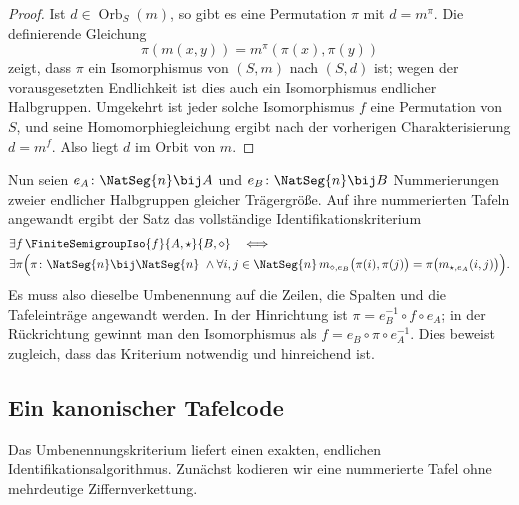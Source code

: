 \documentclass[main.tex]{subfiles}
\begin{document}
\begin{proof}
Ist \(d\in\operatorname{Orb}_S(m)\), so gibt es eine Permutation \(\pi\)
mit \(d=m^\pi\).  Die definierende Gleichung
\[
  \pi(m(x,y))=m^\pi(\pi(x),\pi(y))
\]
zeigt, dass \(\pi\) ein Isomorphismus von \((S,m)\) nach \((S,d)\) ist;
wegen der vorausgesetzten Endlichkeit ist dies auch ein Isomorphismus
endlicher Halbgruppen.  Umgekehrt ist jeder solche Isomorphismus \(f\) eine
Permutation von \(S\), und seine Homomorphiegleichung ergibt nach der
vorherigen Charakterisierung \(d=m^f\).  Also liegt \(d\) im Orbit von
\(m\).
\end{proof}

Nun seien \(e_A\colon\NatSeg{n}\bij A\) und
\(e_B\colon\NatSeg{n}\bij B\) Nummerierungen zweier endlicher
Halbgruppen gleicher Trägergröße.  Auf ihre nummerierten Tafeln
angewandt ergibt der Satz das vollständige Identifikationskriterium
\[
\begin{aligned}
&\exists f\,
  \FiniteSemigroupIso{f}{A,\star}{B,\diamond}
\quad\Longleftrightarrow{}\\[-2pt]
&\exists\pi\Bigl(
  \pi\colon\NatSeg{n}\bij\NatSeg{n}\ \land
  \forall i,j\in\NatSeg{n}\,
  m_{\diamond,e_B}\bigl(\pi(i),\pi(j)\bigr)
    =\pi\bigl(m_{\star,e_A}(i,j)\bigr)
  \Bigr).
\end{aligned}
\]
Es muss also dieselbe Umbenennung auf die Zeilen, die Spalten und die
Tafeleinträge angewandt werden.  In der Hinrichtung ist
\(\pi=e_B^{-1}\circ f\circ e_A\); in der Rückrichtung gewinnt man den
Isomorphismus als \(f=e_B\circ\pi\circ e_A^{-1}\).  Dies beweist zugleich,
dass das Kriterium notwendig und hinreichend ist.

\subsection{Ein kanonischer Tafelcode}

Das Umbenennungskriterium liefert einen exakten, endlichen
Identifikationsalgorithmus.  Zunächst kodieren wir eine nummerierte Tafel
ohne mehrdeutige Ziffernverkettung.
\end{document}
